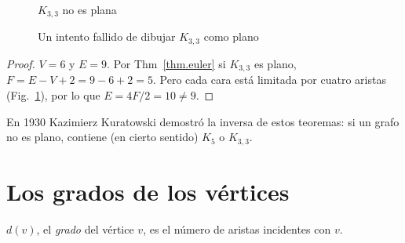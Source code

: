 \begin{figure}[b]
\begin{minipage}{.45\textwidth}
\begin{center}
\caption{$K_{3,3}$ no es plana}\label{f.five-k33}
\end{center}
\end{minipage}
\hfill
\begin{minipage}{.45\textwidth}
\begin{center}
\caption{Un intento fallido de dibujar $K_{3,3}$ como plano}\label{f.five-k33-failed}
\end{center}
\end{minipage}
\end{figure}

\begin{proof}
$V=6$ y $E=9$. Por Thm~\ref{thm.euler} si $K_{3,3}$ es plano, $F=E-V+2=9-6+2=5$. Pero cada cara está limitada por cuatro aristas (Fig.~\ref{f.five-k33-failed}), por lo que $E=4F/2=10\neq 9$.
\end{proof}

En 1930 Kazimierz Kuratowski demostró la inversa de estos teoremas: si un grafo no es plano, contiene (en cierto sentido) $K_5$ o $K_{3,3}$.


\section{Los grados de los vértices}\label{s.degrees}

\begin{definition}
$d(v)$, el \emph{grado} del vértice $v$, es el número de aristas incidentes con $v$.
\end{definition}

